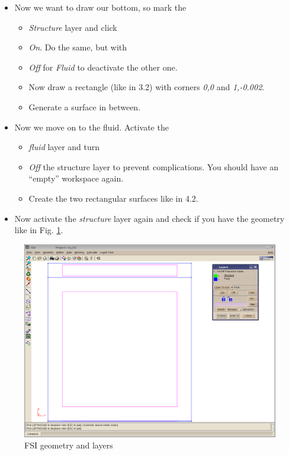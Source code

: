 \begin{itemize}
\item Now we want to draw our bottom, so mark the \emph{}

\begin{itemize}
\item \emph{Structure} layer and click
\item \emph{On}. Do the same, but with \emph{}
\item \emph{Off} for \emph{Fluid} to deactivate the other one. 
\item Now draw a rectangle (like in 3.2) with corners \emph{0,0} and \emph{1,-0.002}. 
\item Generate a surface in between.
\end{itemize}
\item Now we move on to the fluid. Activate the \emph{}

\begin{itemize}
\item \emph{fluid} layer and turn 
\item \emph{Off} the structure layer to prevent complications. You should
have an {}``empty'' workspace again. 
\item Create the two rectangular surfaces like in 4.2.
\end{itemize}
\item Now activate the \emph{structure} layer again and check if you have
the geometry like in Fig. \ref{tut_fsi:5.2}.
\end{itemize}
%
\begin{figure}[h]
\includegraphics[scale=0.4]{Bilder/fsi_02}


\caption{\label{tut_fsi:5.2} FSI geometry and layers}
\end{figure}


